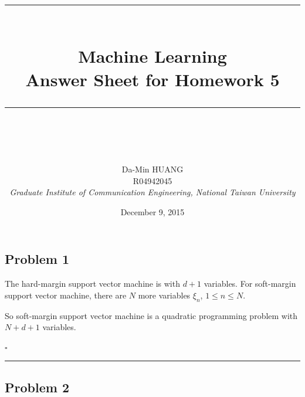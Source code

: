 \documentclass[12pt]{article}
\newcommand*{\QEDB}{\hfill\ensuremath{\square}}
\newcommand{\horrule}[1]{\rule{\linewidth}{#1}}
\begin{document}
\baselineskip 6.5mm
\setlength{\parindent}{0pt}
\title{ 
\normalfont \normalsize 
\horrule{0.5pt} \\[0.4cm]
\huge { \Huge Machine Learning \\ \large Answer Sheet for Homework 5 }\\ %
\horrule{2pt} \\ [0.5cm]
}
\author{ { \Large Da-Min HUANG } \\
{\small R04942045} \\
{\small\textit{Graduate Institute of Communication Engineering, National Taiwan University}}
}
\date{December 9, 2015}
\maketitle

\subsection*{Problem 1}

The hard-margin support vector machine is with $d+1$ variables. For soft-margin support vector machine, there are $N$ more variables $\xi_n$, $1\leq n\leq N$.

So soft-margin support vector machine is a quadratic programming problem with $N+d+1$ variables.

\QEDB

\horrule{0.5pt}

\subsection*{Problem 2}
\end{document}
